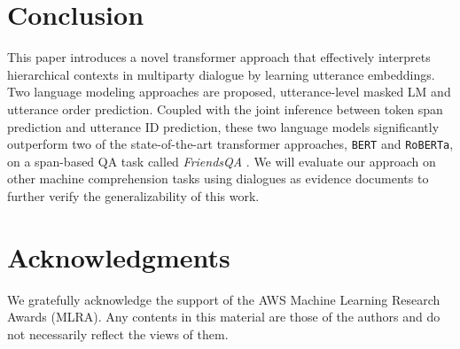 \documentclass[11pt,a4paper]{article}
\begin{document}
\begin{table}[htp!]
\centering{}
\caption{Error types and their ratio with respect to the three most challenging question types.}
\label{tab:error_types}
\end{table} \section{Conclusion}
This paper introduces a novel transformer approach that effectively interprets hierarchical contexts in multiparty dialogue by learning utterance embeddings.
Two language modeling approaches are proposed, utterance-level masked LM and utterance order prediction.
Coupled with the joint inference between token span prediction and utterance ID prediction, these two language models significantly outperform two of the state-of-the-art transformer approaches, \texttt{BERT} and \texttt{RoBERTa}, on a span-based QA task called \textit{FriendsQA}   .
We will evaluate our approach on other machine comprehension tasks using dialogues as evidence documents to further verify the generalizability of this work. 






\label{sec:conclusion} \section*{Acknowledgments}

We gratefully acknowledge the support of the AWS Machine Learning Research Awards (MLRA).
Any contents in this material are those of the authors and do not necessarily reflect the views of them. 


\end{document}
